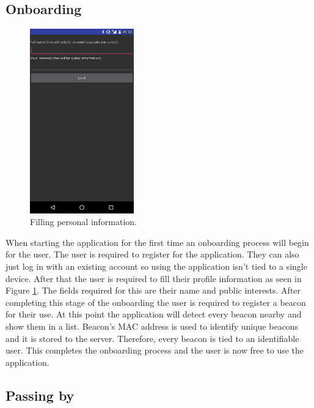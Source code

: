\subsection{Onboarding}

\begin{figure}[htb]
	\begin{center}
		\includegraphics[width=0.4\textwidth]{fs_onboarding.png}
		\caption{Filling personal information.}
		\label{fig:fs_onboarding}
	\end{center}
\end{figure}

When starting the application for the first time an onboarding process will begin for the user. The user is required to register for the application. They can also just log in with an existing account so using the application isn't tied to a single device. After that the user is required to fill their profile information as seen in Figure \ref{fig:fs_onboarding}. The fields required for this are their name and public interests. After completing this stage of the onboarding the user is required to register a beacon for their use. At this point the application will detect every beacon nearby and show them in a list. Beacon's MAC address is used to identify unique beacons and it is stored to the server. Therefore, every beacon is tied to an identifiable user. This completes the onboarding process and the user is now free to use the application.

\subsection{Passing by}

